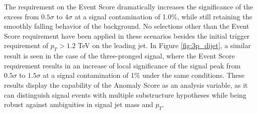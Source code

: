 \documentclass[12pt, a4paper]{article}
\begin{document}
The requirement on the Event Score dramatically increases the significance of the excess from $0.5\sigma$ to $4\sigma$ at a signal contamination of 1.0\%, while still retaining the smoothly falling behavior of the background. No selections other than the Event Score requirement have been applied in these scenarios besides the initial trigger requirement of $p_{T} > 1.2$ TeV on the leading jet. In Figure \ref{fig:3p_dijet}, a similar result is seen in the case of the three-pronged signal, where the Event Score requirement results in an increase of local significance of the signal peak from $0.5\sigma$ to $1.5\sigma$ at a signal contamination of 1\% under the same conditions. These results display the capability of the Anomaly Score as an analysis variable, as it can distinguish signal events with multiple substructure hypotheses while being robust against ambiguities in signal jet mass and $p_{T}$.
\end{document}
